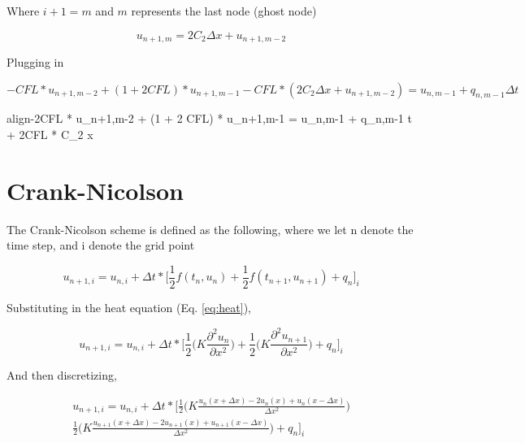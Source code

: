 \documentclass[10pt, letter, showtrims]{extarticle}
\newcommand{\boxedeq}[2]{\begin{empheq}[box={\fboxsep=6pt\fbox}]{align}\label{#1}#2\end{empheq}}
\begin{document}
    		\noindent
    		Where $i+1 = m$ and $m$ represents the last node (ghost node)
    		
    		\begin{equation}
    			u_{n+1,m} = 2 C_{2} \Delta x + u_{n+1,m-2}
    		\end{equation}
    		
    		\noindent
    		Plugging in

		\begin{equation}
			-CFL * u_{n+1,m-2} + (1 + 2 CFL) * u_{n+1,m-1} - CFL * (2 C_{2} \Delta x + u_{n+1,m-2}) = u_{n,m-1} + q_{n,m-1} \Delta t
		\end{equation}    		
    		
    		\boxedeq{}{-2CFL * u_{n+1,m-2} + (1 + 2 CFL) * u_{n+1,m-1} = u_{n,m-1} + q_{n,m-1} \Delta t + 2CFL * C_{2} \Delta x}
    		
		\pagebreak
		
		\noindent
		\section{Crank-Nicolson}
		
		\noindent
		The Crank-Nicolson scheme is defined as the following, where we let n denote the time step, and i denote the grid point
		
		\begin{equation}
			u_{n+1,i} = u_{n,i} + \Delta t * \Big[ \frac{1}{2} f(t_{n}, u_{n}) + \frac{1}{2} f(t_{n+1}, u_{n+1}) + q_{n} \Big]_{i}
		\end{equation}
		
		\noindent
		Substituting in the heat equation (Eq. \ref{eq:heat}),
		
		\begin{equation}
			u_{n+1,i} = u_{n,i} + \Delta t * \Big[ \frac{1}{2} \big( K \frac{\partial^{2} u_{n}}{\partial x^{2}} \big) + \frac{1}{2} \big( K \frac{\partial^{2} u_{n+1}}{\partial x^{2}} \big) + q_{n} \Big]_{i}
		\end{equation}
		
		\noindent
		And then discretizing,
		
		\begin{equation}
		\label{eq:cn}
			\begin{split}
			u_{n+1,i} = u_{n,i} + \Delta t * \Big[ \frac{1}{2} \big( K \frac{u_{n}(x + \Delta x) - 2 u_{n}(x) + u_{n}(x - \Delta x)}{\Delta x^{2}} \big) \\
			 \frac{1}{2} \big( K \frac{u_{n+1}(x + \Delta x) - 2 u_{n+1}(x) + u_{n+1}(x - \Delta x)}{\Delta x^{2}} \big) + q_{n} \Big]_{i}
			\end{split}
		\end{equation}
		
\end{document}
